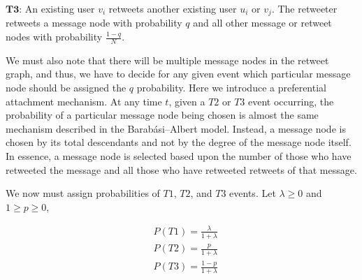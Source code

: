 \vspace{3mm}

$\pmb{T3}$: An existing user $v_i$ retweets another existing user $u_i$ or $v_j$. The retweeter retweets a message node with probability 
$q$ and all other message or retweet nodes with probability $\frac{1-q}{N}$.

\vspace{3mm}

We must also note that there will be multiple message nodes in the retweet graph, and thus,
 we have to decide for any given event
which particular message node should be assigned the $q$ probability.
 Here we introduce a preferential attachment mechanism. At any time $t$,
given a $T2$ or $T3$ event occurring, the probability of a particular message node being chosen is almost the
same mechanism described in the Barabási–Albert model. Instead, a message node is chosen
by its total descendants and not by the degree of the message node itself. In essence, a message node
is selected based upon the number of those who have retweeted the message and all those who have retweeted
retweets of that message.


We now must assign probabilities of $T1$, $T2$, and $T3$ events. Let $\lambda \geq 0$ and $1 \geq p \geq 0$,

\begin{align*}
    &P(T1) = \frac{\lambda}{1 + \lambda} \\
    &P(T2) = \frac{p}{1 + \lambda} \\
    &P(T3) = \frac{1-p}{1 + \lambda} \\
\end{align*}


